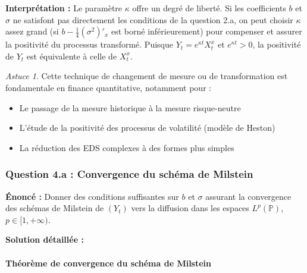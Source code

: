\documentclass[12pt,a4paper]{article}
\theoremstyle{definition}
\theoremstyle{remark}
\newtheorem*{astuce}{Astuce}
\newcommand{\Prob}{\mathbb{P}}
\begin{document}
\textbf{Interprétation :} Le paramètre $\kappa$ offre un degré de liberté. Si les coefficients $b$ et $\sigma$ ne satisfont pas directement les conditions de la question 2.a, on peut choisir $\kappa$ assez grand (si $b - \frac{1}{4}(\sigma^2)'_x$ est borné inférieurement) pour compenser et assurer la positivité du processus transformé. Puisque $Y_t = e^{\kappa t}X_t^x$ et $e^{\kappa t} > 0$, la positivité de $Y_t$ est équivalente à celle de $X_t^x$.

\begin{astuce}
Cette technique de changement de mesure ou de transformation est fondamentale en finance quantitative, notamment pour :
\begin{itemize}
\item Le passage de la mesure historique à la mesure risque-neutre
\item L'étude de la positivité des processus de volatilité (modèle de Heston)
\item La réduction des EDS complexes à des formes plus simples
\end{itemize}
\end{astuce}

\newpage
\subsubsection{Question 4.a : Convergence du schéma de Milstein}

\textbf{Énoncé :} Donner des conditions suffisantes sur $b$ et $\sigma$ assurant la convergence des schémas de Milstein de $(Y_t)$ vers la diffusion dans les espaces $L^p(\Prob)$, $p \in [1,+\infty)$.

\textbf{Solution détaillée :}

\paragraph{Théorème de convergence du schéma de Milstein}
\end{document}
